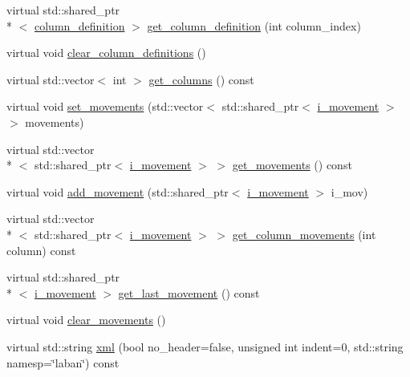 \begin{DoxyCompactItemize}
\item 
virtual std\-::shared\-\_\-ptr\\*
$<$ \hyperlink{classmae_1_1fl_1_1laban_1_1column__definition}{column\-\_\-definition} $>$ \hyperlink{classmae_1_1fl_1_1laban_1_1laban__sequence_a11c4910c4e2ec129b97f5a3e32068b37}{get\-\_\-column\-\_\-definition} (int column\-\_\-index)
\item 
virtual void \hyperlink{classmae_1_1fl_1_1laban_1_1laban__sequence_a000c70087df3c9c26d998c70817510b3}{clear\-\_\-column\-\_\-definitions} ()
\item 
virtual std\-::vector$<$ int $>$ \hyperlink{classmae_1_1fl_1_1laban_1_1laban__sequence_a3118ce9825c1cb3fbfa2056c749ef443}{get\-\_\-columns} () const 
\item 
virtual void \hyperlink{classmae_1_1fl_1_1laban_1_1laban__sequence_a4eb384cdf22eed513c270b55fc8cdee9}{set\-\_\-movements} (std\-::vector$<$ std\-::shared\-\_\-ptr$<$ \hyperlink{classmae_1_1fl_1_1laban_1_1i__movement}{i\-\_\-movement} $>$ $>$ movements)
\item 
virtual std\-::vector\\*
$<$ std\-::shared\-\_\-ptr$<$ \hyperlink{classmae_1_1fl_1_1laban_1_1i__movement}{i\-\_\-movement} $>$ $>$ \hyperlink{classmae_1_1fl_1_1laban_1_1laban__sequence_abdf122b607f4358db8abedd9d9b1f229}{get\-\_\-movements} () const 
\item 
virtual void \hyperlink{classmae_1_1fl_1_1laban_1_1laban__sequence_a1ec3c759e137d03d02aba607cb661a13}{add\-\_\-movement} (std\-::shared\-\_\-ptr$<$ \hyperlink{classmae_1_1fl_1_1laban_1_1i__movement}{i\-\_\-movement} $>$ i\-\_\-mov)
\item 
virtual std\-::vector\\*
$<$ std\-::shared\-\_\-ptr$<$ \hyperlink{classmae_1_1fl_1_1laban_1_1i__movement}{i\-\_\-movement} $>$ $>$ \hyperlink{classmae_1_1fl_1_1laban_1_1laban__sequence_a64d4eaaedfd869b412a783eb22ef5e8b}{get\-\_\-column\-\_\-movements} (int column) const 
\item 
virtual std\-::shared\-\_\-ptr\\*
$<$ \hyperlink{classmae_1_1fl_1_1laban_1_1i__movement}{i\-\_\-movement} $>$ \hyperlink{classmae_1_1fl_1_1laban_1_1laban__sequence_aa68bcf9a41a923fc4aab04e9b81a0634}{get\-\_\-last\-\_\-movement} () const 
\item 
virtual void \hyperlink{classmae_1_1fl_1_1laban_1_1laban__sequence_a90625de305a9400a3d6865bda683c14b}{clear\-\_\-movements} ()
\item 
virtual std\-::string \hyperlink{classmae_1_1fl_1_1laban_1_1laban__sequence_a215d2acb9346283d761560a29e745815}{xml} (bool no\-\_\-header=false, unsigned int indent=0, std\-::string namesp=\char`\"{}laban\char`\"{}) const 

\end{DoxyCompactItemize}
